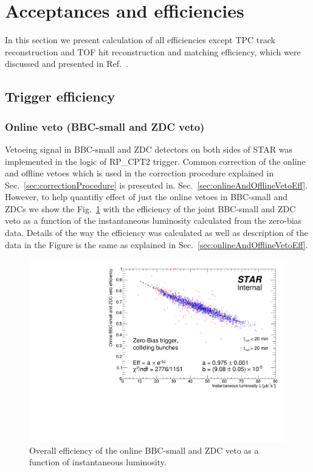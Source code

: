 \section{Acceptances and efficiencies}

In this section we present calculation of all efficiencies except TPC track reconstruction and TOF hit reconstruction and matching efficiency, which were discussed and presented in Ref.~\cite{supplementaryNote}.

\subsection{Trigger efficiency}\label{sec:triggerEff}
\subsubsection{Online veto (BBC-small and ZDC veto)}\label{sec:onlineVetoEff}

Vetoeing signal in BBC-small and ZDC detectors on both sides of STAR was implemented in the logic of RP\_CPT2 trigger. Common correction of the online and offline vetoes which is used in the correction procedure explained in Sec.~\ref{sec:correctionProcedure} is presented in. Sec.~\ref{sec:onlineAndOfflineVetoEff}. However, to help quantifiy effect of just the online vetoes in BBC-small and ZDCs we show the Fig.~\ref{fig:onlineVetoEff} with the efficiency of the joint BBC-small and ZDC veto as a function of the instantaneous luminosity calculated from the zero-bias data. Details of the way the efficiency was calculated as well as description of the data in the Figure is the same as explained in Sec.~\ref{sec:onlineAndOfflineVetoEff}.
\begin{figure}[ht!]
\centering%
\includegraphics[width=0.65\linewidth,page=1]{graphics/corrections/OnlineVetoEffVsInstLumi_graph.pdf}%
\caption{Overall efficiency of the online BBC-small and ZDC veto as a function of instantaneous luminosity.}\label{fig:onlineVetoEff}%
\end{figure}

